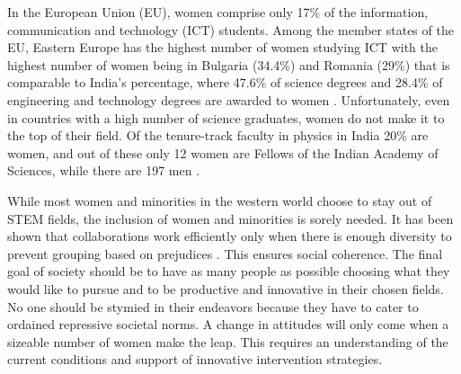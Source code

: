 \documentclass[utf8]{frontiersSCNS} %
\begin{document}
In the European Union (EU), women comprise only 17\% of the information, communication and technology (ICT) students.  Among the member states of the EU, Eastern Europe has the highest number of women studying ICT with the highest number of women being in Bulgaria (34.4\%) and Romania (29\%) \citep{EuStats} that is comparable to India's percentage, where 47.6\% of science degrees and  28.4\% of engineering and technology degrees are awarded to women \citep{India2017}. Unfortunately, even in countries with a high number of science graduates, women do not make it to the top of their field. Of the tenure-track faculty in physics in India 20\% are women, and out of these only 12 women are Fellows of the Indian Academy of Sciences, while there are 197 men \citep{WiredIndiaFaculty}.

While most women and minorities in the western world choose to stay out of STEM fields, the inclusion of women and minorities is sorely needed. It has been shown that collaborations work efficiently only when there is enough diversity to prevent grouping based on prejudices \citep{page2007making}. This ensures social coherence. %
The final goal of society should be to have as many people as possible choosing what they would like to pursue and to be productive and innovative in their chosen fields. No one should be stymied in their endeavors because they have to cater to ordained repressive societal norms. A change in attitudes will only come when a sizeable number of women make the leap. This requires an understanding of the current conditions and support of innovative intervention strategies.
\end{document}
